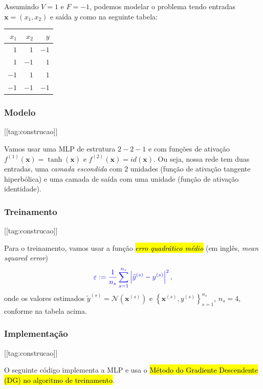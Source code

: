 Assumindo $V = 1$ e $F = -1$, podemos modelar o problema tendo entradas $\pmb{x} = (x_1, x_2)$ e saída $y$ como na seguinte tabela:

\begin{center}
  \begin{tabular}{rr|r}
    $x_1$ & $x_2$ & $y$ \\\hline
    $1$ & $1$ & $-1$ \\
    $1$ & $-1$ & $1$ \\
    $-1$ & $1$ & $1$ \\
    $-1$ & $-1$ & $-1$ \\\hline
  \end{tabular}
\end{center}

\subsubsection{Modelo}
[[tag:construcao]]

Vamos usar uma MLP de estrutura $2-2-1$ e com funções de ativação $f^{(1)}(\pmb{x}) = \tanh(\pmb{x})$ e $f^{(2)}(\pmb{x}) = id(\pmb{x})$. Ou seja, nossa rede tem duas entradas, uma \emph{camada escondida} com 2 unidades (função de ativação tangente hiperbólica) e uma camada de saída com uma unidade (função de ativação identidade).

\subsubsection{Treinamento}

[[tag:construcao]]

Para o treinamento, vamos usar a função \hl{\emph{erro quadrático médio}} (em inglês, \textit{mean squared error})
\begin{equation}\color{blue}\varepsilon := \frac{1}{n_s}\sum_{s=1}^{n_s}\left|\tilde{y}^{(s)} - y^{(s)}\right|^2,
\end{equation}
onde os valores estimados $\tilde{y}^{(s)} = \mathcal{N}\left(\pmb{x}^{(s)}\right)$ e $\left\{\pmb{x}^{(s)}, y^{(s)}\right\}_{s=1}^{n_s}$, $n_s=4$, conforme na tabela acima.

\subsubsection{Implementação}

[[tag:construcao]]

O seguinte código implementa a MLP e usa o \hl{Método do Gradiente Descendente (DG) no algoritmo de treinamento}.

